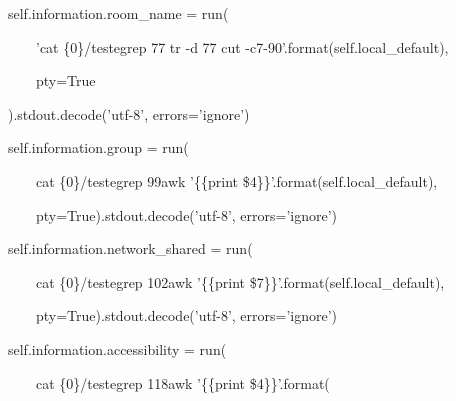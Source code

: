     \bigskip

{\ttfamily\color[rgb]{0.10980392,0.10980392,0.10980392}
    \ \ \ \ \ \ \ \ self.information.room\_name = run(}

            {\ttfamily\color[rgb]{0.10980392,0.10980392,0.10980392}
            \ \ \ \ \ \ \ \ \ \ \ \ {}'cat \{0\}/teste{\textbar}grep 77 {\textbar}tr -d 77 {\textbar}cut
            -c7-90'.format(self.local\_default),}

            {\ttfamily\color[rgb]{0.10980392,0.10980392,0.10980392}
            \ \ \ \ \ \ \ \ \ \ \ \ pty=True}

            {\ttfamily\color[rgb]{0.10980392,0.10980392,0.10980392}
            \ \ \ \ \ \ \ \ ).stdout.decode('utf-8', errors='ignore')}


    \bigskip

{\ttfamily\color[rgb]{0.10980392,0.10980392,0.10980392}
    \ \ \ \ \ \ \ \ self.information.group = run(}

            {\ttfamily\color[rgb]{0.10980392,0.10980392,0.10980392}
            \ \ \ \ \ \ \ \ \ \ \ \ {\textquotedbl}cat \{0\}/teste{\textbar}grep 99{\textbar}awk '\{\{print
            \$4\}\}'{\textquotedbl}.format(self.local\_default),}

            {\ttfamily\color[rgb]{0.10980392,0.10980392,0.10980392}
            \ \ \ \ \ \ \ \ \ \ \ \ pty=True).stdout.decode('utf-8', errors='ignore')}


    \bigskip

{\ttfamily\color[rgb]{0.10980392,0.10980392,0.10980392}
    \ \ \ \ \ \ \ \ self.information.network\_shared = run(}

            {\ttfamily\color[rgb]{0.10980392,0.10980392,0.10980392}
            \ \ \ \ \ \ \ \ \ \ \ \ {\textquotedbl}cat \{0\}/teste{\textbar}grep 102{\textbar}awk '\{\{print
            \$7\}\}'{\textquotedbl}.format(self.local\_default),}

            {\ttfamily\color[rgb]{0.10980392,0.10980392,0.10980392}
            \ \ \ \ \ \ \ \ \ \ \ \ pty=True).stdout.decode('utf-8', errors='ignore')}


    \bigskip

{\ttfamily\color[rgb]{0.10980392,0.10980392,0.10980392}
    \ \ \ \ \ \ \ \ self.information.accessibility = run(}

            {\ttfamily\color[rgb]{0.10980392,0.10980392,0.10980392}
            \ \ \ \ \ \ \ \ \ \ \ \ {\textquotedbl}cat \{0\}/teste{\textbar}grep 118{\textbar}awk '\{\{print
            \$4\}\}'{\textquotedbl}.format(}

